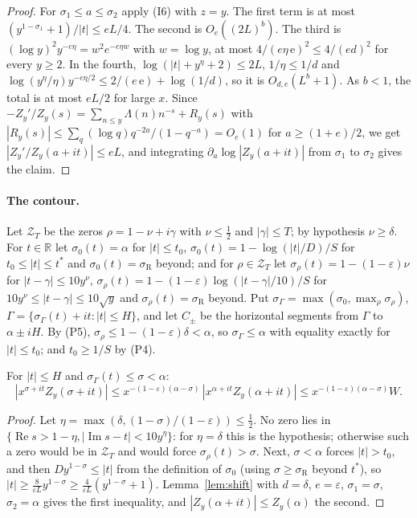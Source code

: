 \begin{proof}
For $\sigma_1\le a\le\sigma_2$ apply (I6) with $z=y$. The first term is at most
$(y^{1-\sigma_1}+1)/|t|\le eL/4$. The second is $O_e((2L)^b)$. The third is
$(\log y)^2y^{-e\eta}=w^2e^{-e\eta w}$ with $w=\log y$, at most $4/(e\eta\,\mathrm e)^2\le4/(ed)^2$ for every
$y\ge2$. In the fourth, $\log(|t|+y^\eta+2)\le2L$, $1/\eta\le1/d$ and
$\log(y^\eta/\eta)y^{-e\eta/2}\le2/(e\,\mathrm e)+\log(1/d)$, so it is $O_{d,e}(L^b+1)$. As $b<1$, the
total is at most $eL/2$ for large $x$. Since $-Z_y'/Z_y(s)=\sum_{n\le y}\Lambda(n)n^{-s}+R_y(s)$ with
$|R_y(s)|\le\sum_q(\log q)q^{-2a}/(1-q^{-a})=O_e(1)$ for $a\ge(1+e)/2$, we get $|Z_y'/Z_y(a+it)|\le eL$, and
integrating $\partial_a\log|Z_y(a+it)|$ from $\sigma_1$ to $\sigma_2$ gives the claim.
\end{proof}

\paragraph{The contour.}
Let $\mathcal Z_T$ be the zeros $\rho=1-\nu+i\gamma$ with $\nu\le\tfrac12$ and $|\gamma|\le T$; by hypothesis
$\nu\ge\delta$. For $t\in\mathbb R$ let $\sigma_0(t)=\alpha$ for $|t|\le t_0$, $\sigma_0(t)=1-\log(|t|/D)/S$ for
$t_0\le|t|\le t^*$ and $\sigma_0(t)=\sigma_{\mathrm R}$ beyond; and for $\rho\in\mathcal Z_T$ let
$\sigma_\rho(t)=1-(1-\varepsilon)\nu$ for $|t-\gamma|\le10y^\nu$,
$\sigma_\rho(t)=1-(1-\varepsilon)\log(|t-\gamma|/10)/S$ for $10y^\nu\le|t-\gamma|\le10\sqrt y$ and
$\sigma_\rho(t)=\sigma_{\mathrm R}$ beyond. Put $\sigma_\Gamma=\max(\sigma_0,\max_\rho\sigma_\rho)$,
$\Gamma=\{\sigma_\Gamma(t)+it:|t|\le H\}$, and let $C_\pm$ be the horizontal segments from $\Gamma$ to
$\alpha\pm iH$. By (P5), $\sigma_\rho\le1-(1-\varepsilon)\delta<\alpha$, so $\sigma_\Gamma\le\alpha$ with
equality exactly for $|t|\le t_0$; and $t_0\ge1/S$ by (P4).

\begin{lemma}\label{lem:pointwise}
For $|t|\le H$ and $\sigma_\Gamma(t)\le\sigma<\alpha$:
\[
|x^{\sigma+it}Z_y(\sigma+it)|\le x^{-(1-\varepsilon)(\alpha-\sigma)}\,|x^{\alpha+it}Z_y(\alpha+it)|
\le x^{-(1-\varepsilon)(\alpha-\sigma)}W .
\]
\end{lemma}

\begin{proof}
Let $\eta=\max(\delta,(1-\sigma)/(1-\varepsilon))\le\tfrac12$. No zero lies in
$\{\operatorname{Re}s>1-\eta,|\operatorname{Im}s-t|<10y^\eta\}$: for $\eta=\delta$ this is the hypothesis;
otherwise such a zero would be in $\mathcal Z_T$ and would force $\sigma_\rho(t)>\sigma$. Next,
$\sigma<\alpha$ forces $|t|>t_0$, and then $Dy^{1-\sigma}\le|t|$ from the definition of $\sigma_0$ (using
$\sigma\ge\sigma_{\mathrm R}$ beyond $t^*$), so $|t|\ge\frac8{\varepsilon L}y^{1-\sigma}\ge\frac4{\varepsilon L}(y^{1-\sigma}+1)$.
Lemma~\ref{lem:shift} with $d=\delta$, $e=\varepsilon$, $\sigma_1=\sigma$, $\sigma_2=\alpha$ gives the first
inequality, and $|Z_y(\alpha+it)|\le Z_y(\alpha)$ the second.
\end{proof}

